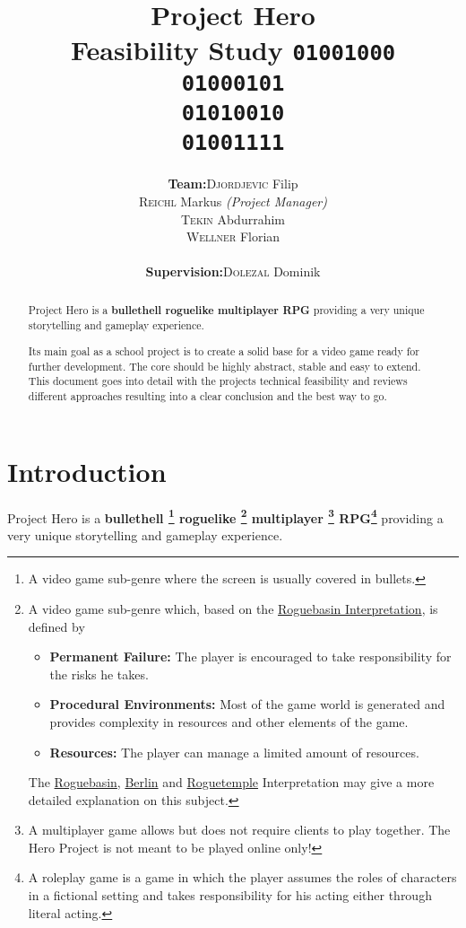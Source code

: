 \documentclass[11pt]{article}
\title{
  \textbf{Project Hero}\\
  \large{Feasibility Study}
  \linebreak
  \linebreak
  \small{\texttt{01001000\\01000101\\01010010\\01001111}}
}
\author{
  \begin{tabular}{rl}
    \textbf{Team:}
    & \textsc{Djordjevic} Filip\\
    & \textsc{Reichl} Markus \small{\textit{(Project Manager)}}\\
    & \textsc{Tekin} Abdurrahim\\
    & \textsc{Wellner} Florian\\
    \\
    \textbf{Supervision:}
    & \textsc{Dolezal} Dominik
  \end{tabular}
}
\begin{document}
\begin{titlepage}
  \clearpage
  \maketitle
  \thispagestyle{empty}
  
  \begin{abstract}
    \begin{flushleft}
      Project Hero is a \textbf{bullethell roguelike multiplayer RPG} providing a very unique storytelling and gameplay experience.
      
      Its main goal as a school project is to create a solid base for a video game ready for further development. The core should be highly abstract, stable and easy to extend.
      \linebreak
      \linebreak
      This document goes into detail with the projects technical feasibility and reviews different approaches resulting into a clear conclusion and the best way to go.
     \end{flushleft}
  \end{abstract}
\end{titlepage}

\tableofcontents
\newpage

\section{Introduction}
Project Hero is a \textbf{
  bullethell
  \footnote{A video game sub-genre where the screen is usually covered in bullets.}
  roguelike
  \footnote{A video game sub-genre which, based on the \href{http://roguebasin.com/roguelike-definition}{Roguebasin Interpretation}, is defined by 
    \begin{itemize}
      \item \textbf{Permanent Failure:} The player is encouraged to take responsibility for the risks he takes.
      \item \textbf{Procedural Environments:} Most of the game world is generated and provides complexity in resources and other elements of the game.
      \item \textbf{Resources:} The player can manage a limited amount of resources.
    \end{itemize}
    The \href{http://roguebasin.com/roguelike-definition}{Roguebasin}, \href{http://roguebasin.com/index.php?title=Berlin_Interpretation}{Berlin} and \href{http://roguetemple.com/roguelike-definition}{Roguetemple} Interpretation may give a more detailed explanation on this subject.
  }
  multiplayer
  \footnote{A multiplayer game allows but does not require clients to play together. The Hero Project is not meant to be played online only!}
  RPG\footnote{A roleplay game is a game in which the player assumes the roles of characters in a fictional setting and takes responsibility for his acting either through literal acting.}
} providing a very unique storytelling and gameplay experience.
\end{document}
